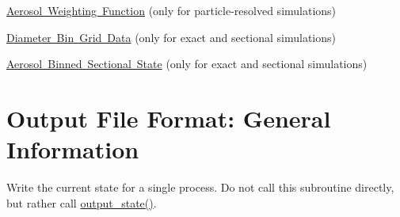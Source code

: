 \mbox{\hyperlink{output_format_aero_weight_array}{Aerosol Weighting Function}} (only for particle-\/resolved simulations)

\mbox{\hyperlink{output_format_diam_bin_grid}{Diameter Bin Grid Data}} (only for exact and sectional simulations)

\mbox{\hyperlink{output_format_aero_binned}{Aerosol Binned Sectional State}} (only for exact and sectional simulations) \hypertarget{output_format_general}{}\section{Output File Format\+: General Information}\label{output_format_general}
Write the current state for a single process. Do not call this subroutine directly, but rather call \mbox{\hyperlink{namespacepmc__output_a3450534dae32c9b056de1292c80e0472}{output\+\_\+state()}}.


